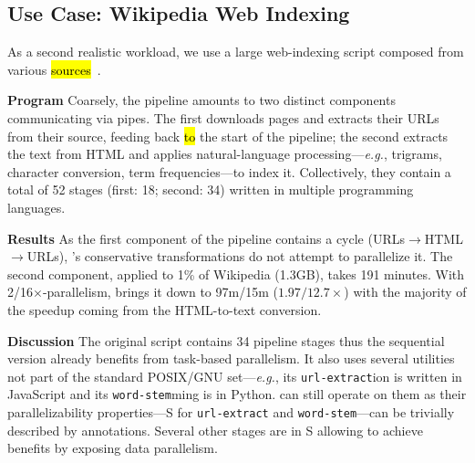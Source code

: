 \documentclass[letterpaper,twocolumn,10pt]{article}
\newcommand{\eg}{{\em e.g.}, }
\newcommand{\heading}[1]{\vspace{4pt}\noindent\textbf{#1}\enspace}
\newcommand{\ttt}[1]{\texttt{#1}}
\newcommand{\cn}[1]{\mbox{\textcircled{\footnotesize #1}}}
\newcommand{\sta}{\cn{\textsc{S}}\xspace}
\newcommand{\todo}[1]{\hl{#1}\xspace}
\newcommand{\kk}[1]{[{\color{magenta}kk: #1}]}
\begin{document}
% 
\subsection{Use Case: Wikipedia Web Indexing}
\label{macro2}

As a second realistic workload, we use a large web-indexing script composed from various \todo{sources}~\cite{}.

\heading{Program}
Coarsely, the pipeline amounts to two distinct components communicating via \unix pipes.
The first downloads pages and extracts their URLs from their source, feeding back \todo{to} the start of the pipeline;
 the second extracts the text from HTML and applies natural-language processing---\eg trigrams, character conversion, term frequencies---to index it.
Collectively, they contain a total of 52 stages (first: 18; second: 34) written in multiple programming languages.

\heading{Results}
As the first component of the pipeline contains a cycle (URLs$\rightarrow$HTML$\rightarrow$URLs), \sys's conservative transformations do not attempt to parallelize it.
The second component, applied to 1\% of Wikipedia (1.3GB), takes 191 minutes.
With 2/16$\times$-parallelism, \sys brings it down to 97m/15m ($1.97/12.7\times$) with the majority of the speedup coming from the HTML-to-text conversion. %


\heading{Discussion}
The original script contains 34 pipeline stages thus the sequential version already benefits from task-based parallelism.
It also uses several utilities not part of the standard POSIX/GNU set---\eg its \ttt{url-extract}ion is written in JavaScript and its \ttt{word-stem}ming is in Python.
\sys can still operate on them as their parallelizability properties---\sta for \ttt{url-extract} and \ttt{word-stem}---can be trivially described by annotations.
Several other stages are in \sta allowing \sys to achieve benefits by exposing data parallelism.
\end{document}
